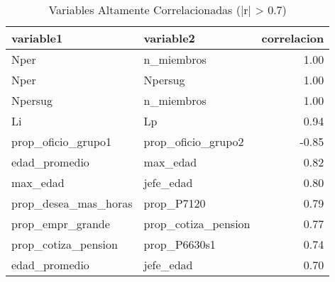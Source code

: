\begin{table}[ht]
\centering
\begin{tabular}{llr}
  \toprule
variable1 & variable2 & correlacion \\ 
  \midrule
Nper & n\_miembros & 1.00 \\ 
  Nper & Npersug & 1.00 \\ 
  Npersug & n\_miembros & 1.00 \\ 
  Li & Lp & 0.94 \\ 
  prop\_oficio\_grupo1 & prop\_oficio\_grupo2 & -0.85 \\ 
  edad\_promedio & max\_edad & 0.82 \\ 
  max\_edad & jefe\_edad & 0.80 \\ 
  prop\_desea\_mas\_horas & prop\_P7120 & 0.79 \\ 
  prop\_empr\_grande & prop\_cotiza\_pension & 0.77 \\ 
  prop\_cotiza\_pension & prop\_P6630s1 & 0.74 \\ 
  edad\_promedio & jefe\_edad & 0.70 \\ 
   \bottomrule
\end{tabular}
\caption{Variables Altamente Correlacionadas (|r| > 0.7)} 
\label{tab:high_correlation}
\end{table}
